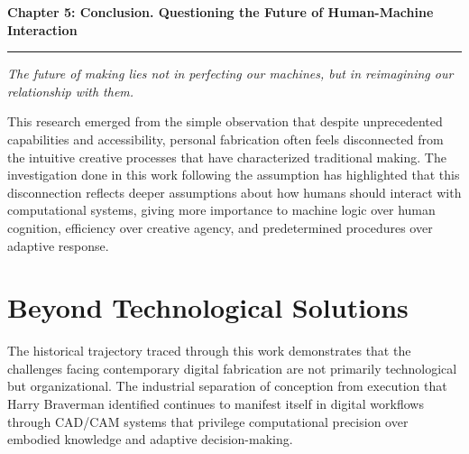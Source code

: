 \clearpage

\setcounter{chapter}{5}
\setcounter{section}{0}


\pagestyle{fancy}
\fancyhf{} %
\fancyfoot[C]{\thepage} %
\renewcommand{\headrulewidth}{0pt}
\renewcommand{\footrulewidth}{0pt}

\noindent
{\Large\textbf{Chapter 5: Conclusion. Questioning the Future of Human-Machine Interaction}}
\vspace{0.3cm}
\hrule
\vspace{0.8cm}
\label{ch:conclusions}

\setlength{\parindent}{0pt}

\textit{The future of making lies not in perfecting our machines, but in reimagining our relationship with them.}

\vspace{0.5cm}

This research emerged from the simple observation that despite unprecedented capabilities and accessibility, personal fabrication often feels disconnected from the intuitive creative processes that have characterized traditional making. The investigation done in this work following the assumption has highlighted that this disconnection reflects deeper assumptions about how humans should interact with computational systems, giving more importance to machine logic over human cognition, efficiency over creative agency, and predetermined procedures over adaptive response.

\section{Beyond Technological Solutions}

The historical trajectory traced through this work demonstrates that the challenges facing contemporary digital fabrication are not primarily technological but organizational. The industrial separation of conception from execution that Harry Braverman identified continues to manifest itself in digital workflows through CAD/CAM systems that privilege computational precision over embodied knowledge and adaptive decision-making.

